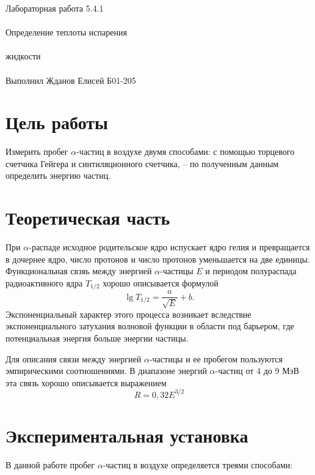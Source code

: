 \documentclass{astroedu-lab}
\begin{document}
\pagestyle{plain}

\begin{problem}{\huge Лабораторная работа 5.4.1\\\\Определение теплоты испарения\\\\жидкости\\\\Выполнил Жданов Елисей Б01-205}

\section{Цель работы}

Измерить пробег $\alpha$-частиц в воздухе двумя способами: с помощью торцевого счетчика Гейгера и синтиляционного счетчика, -- по полученным данным определить энергию частиц.

\section{Теоретическая часть}
	При $\alpha$-распаде исходное родительское ядро испускает ядро гелия и превращается в дочернее ядро, число протонов и число протонов уменьшается на две единицы. Функциональная свзяь между энергией $\alpha$-частицы $E$ и периодом полураспада радиоактивного ядра $T_{1/2}$ хорошо описывается формулой
	\begin{equation*}
		 \lg T_{1/2} = \frac{a}{\sqrt{E}} + b.
	\end{equation*}
	Экспоненциальный характер этого процесса возникает вследствие экспоненциального затухания волновой функции в области под барьером, где потенциальная энергия больше энергии частицы.
	
	Для описания связи между энергией $\alpha$-частицы и ее пробегом пользуются эмпирическими соотношениями. В диапазоне энергий $\alpha$-частиц от 4 до 9 МэВ эта связь хорошо описывается выражением
	\begin{equation*}
		\label{eq:R(E)}
		\tag{$\star$}
		R = 0,32E^{3/2}
	\end{equation*}

\section{Экспериментальная установка}
	В данной работе пробег $\alpha$-частиц в воздухе определяется треями способами:


\end{problem}
\end{document}
